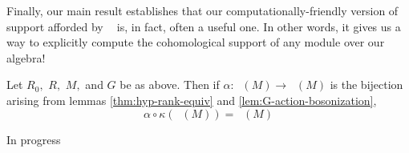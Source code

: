 \documentclass [11pt, proquest] {uwthesis}[2020/02/24]
\DeclareMathOperator{\supphR}{supp^\mathit{hyp}_R}
\DeclareMathOperator{\suppc}{supp^\mathit{coh}_R}
\DeclareMathOperator{\suppr}{supp^\mathit{rnk}}
\DeclareMathOperator{\supprR}{supp^\mathit{rnk}_R}
\begin{document}
    
    Finally, our main result establishes that our computationally-friendly version of support afforded by $\suppr$ is, in fact, often a useful one. In other words, it gives us a way to explicitly compute the cohomological support of any module over our algebra!
    
    \begin{thm}\label{thm:support-inclusion}
        Let $R_0,$ $R,$ $M,$ and $G$ be as above. Then if $\alpha:\supphR(M)\to \supprR(M)$ is the bijection arising from lemmas \ref{thm:hyp-rank-equiv} and \ref{lem:G-action-bosonization},
        \[\alpha\circ\kappa(\suppc(M))=\supprR(M)\]
    \end{thm}
    \begin{prf}
        In progress
    \end{prf}
\end{document}
